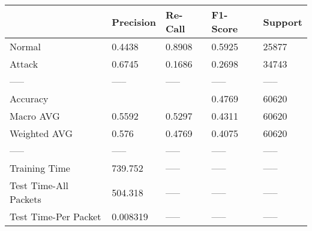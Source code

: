 \begin{tabular}{lllll}
\toprule
{} & Precision & Re-Call & F1-Score & Support \\
\midrule
Normal                &    0.4438 &  0.8908 &   0.5925 &   25877 \\
Attack                &    0.6745 &  0.1686 &   0.2698 &   34743 \\
-----                 &     ----- &   ----- &    ----- &   ----- \\
Accuracy              &           &         &   0.4769 &   60620 \\
Macro AVG             &    0.5592 &  0.5297 &   0.4311 &   60620 \\
Weighted AVG          &     0.576 &  0.4769 &   0.4075 &   60620 \\
-----                 &     ----- &   ----- &    ----- &   ----- \\
Training Time         &   739.752 &   ----- &    ----- &   ----- \\
Test Time-All Packets &   504.318 &   ----- &    ----- &   ----- \\
Test Time-Per Packet  &  0.008319 &   ----- &    ----- &   ----- \\
\bottomrule
\end{tabular}
